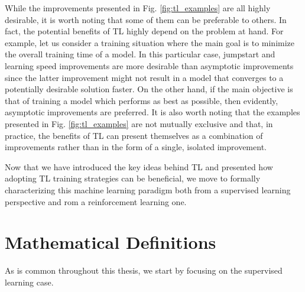 

While the improvements presented in Fig. \ref{fig:tl_examples} are all highly desirable, it is worth noting that some of them can be preferable to others. In fact, the potential benefits of TL highly depend on the problem at hand. For example, let us consider a training situation where the main goal is to minimize the overall training time of a model. In this particular case, jumpstart and learning speed improvements are more desirable than asymptotic improvements since the latter improvement might not result in a model that converges to a potentially desirable solution faster. On the other hand, if the main objective is that of training a model which performs as best as possible, then evidently, asymptotic improvements are preferred. It is also worth noting that the examples presented in Fig. \ref{fig:tl_examples} are not mutually exclusive and that, in practice, the benefits of TL can present themselves as a combination of improvements rather than in the form of a single, isolated improvement. 

Now that we have introduced the key ideas behind TL and presented how adopting TL training strategies can be beneficial, we move to formally characterizing this machine learning paradigm both from a supervised learning perspective and rom a reinforcement learning one.

\section{Mathematical Definitions}
\label{sec:definitions}

As is common throughout this thesis, we start by focusing on the supervised learning case.

